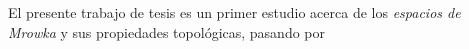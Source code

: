 El presente trabajo de tesis es un primer estudio acerca de los \textit{espacios de Mrowka} y sus propiedades topológicas, pasando por 